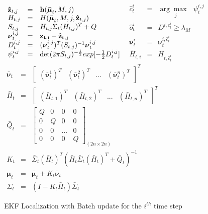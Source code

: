 \documentclass[11pt,a4paper]{article}
\begin{document}
\begin{algorithm}[H]
	\begin{algorithmic}
	\STATE
	$
	\begin{array}{lll}
	{\bf\hat z}_{t,j} &=& {\bf h}(\boldsymbol{\bar\mu}_{t},M,j)\\
	H_{t,j} &=& H(\boldsymbol{\bar\mu}_{t}, M,j,{\bf\hat z}_{t,j})\\
	S_{t,j} &=& H_{t,j} \bar\Sigma_t (H_{t,j})^T + Q\\
	\boldsymbol{\nu}^{i,j}_{t} &=& \bf z_{t,i} - \hat z_{t,j}\\
	D^{i,j}_{t} &=& (\boldsymbol{\nu}^{i,j}_{t})^T(S_{t,j})^{-1}\boldsymbol\nu^{i,j}_{t}\\
	\psi^{i,j}_{t} & = & \det(2\pi S_{t,j})^{-\frac{1}{2}} exp[-\frac{1}{2}D^{i,j}_{t}]\\
	\end{array}
	$
	\ENDFOR
	\STATE
	$
	\begin{array}{lll}
	\hat c^i_t &=& \underset{j}{\arg\max \texttt{ }} \psi^{i,j}_{t}\\
	\hat o^i_t &=& D^{i,c^i_t} \geq \lambda_M \\
	\boldsymbol{\bar\nu}^i_t &=& \boldsymbol\nu^{i,\hat c^i_t}_{t}\\
	\bar H_{t,i} &=& H_{t,\hat c^i_t}
	\end{array}
	$
	\ENDFOR
	\STATE {}
	\STATE
	$
	\begin{array}{lll}
	\boldsymbol{\bar\nu}_{t} &=& \left[
	\begin{array}{llll}
	(\boldsymbol{\bar\nu}^1_t)^T & (\boldsymbol{\bar\nu}^2_t)^T & ... & (\boldsymbol{\bar\nu}^n_t)^T
	\end{array}\right]^T \\
	\bar H_t &=&
	\left[
	\begin{array}{llll}
	(\bar H_{t,1})^T & (\bar H_{t,2})^T & ... & (\bar H_{t,n})^T
	\end{array}\right]^T \\
	\bar Q_t &=&
	\left[
	\begin{array}{llll}
		Q & 0& 0 & 0\\
		 0& Q & 0 & 0\\
		0& 0 & ... & 0\\
		0 & 0 & 0 & Q
	\end{array}
	\right]_{(2n \times 2n)} \\
	K_t &=& \bar \Sigma_t (\bar H_t)^T (\bar H_t \bar \Sigma_t (\bar H_t)^T + \bar Q_t)^{-1}\\
	{\boldsymbol\mu}_{t} &=& \boldsymbol{\bar\mu}_{t} + K_t\boldsymbol{\bar\nu}_{t}\\
	\Sigma_t &=& (I-K_t \bar H_t)\bar\Sigma_t
	\end{array}
	$
	\end{algorithmic}
	\caption{EKF Localization with Batch update for the $i^{th}$ time step}
	\label{alg:batch_update}
\end{algorithm}
\end{document}
